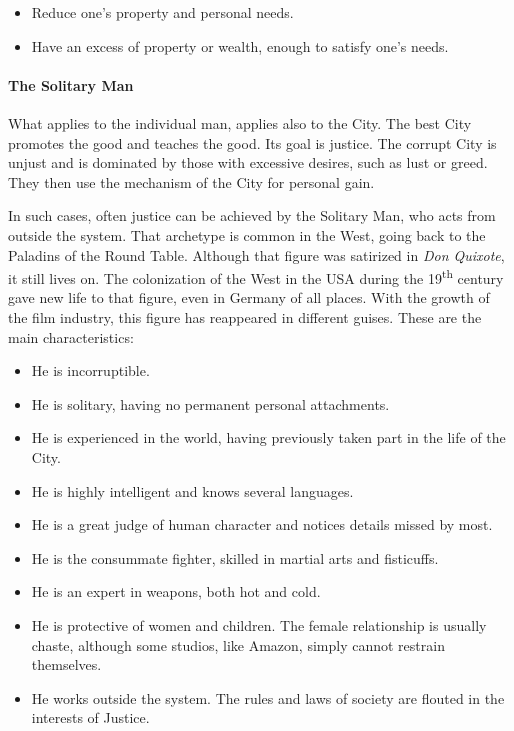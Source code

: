 \begin{itemize}


\item Reduce one's property and personal needs.

\item Have an excess of property or wealth, enough to satisfy one's needs.
\end{itemize}


\paragraph{The Solitary Man}


What applies to the individual man, applies also to the City. The best City promotes the good and teaches the good. Its goal is justice. The corrupt City is unjust and is dominated by those with excessive desires, such as lust or greed. They then use the mechanism of the City for personal gain.

In such cases, often justice can be achieved by the Solitary Man, who acts from outside the system. That archetype is common in the West, going back to the Paladins of the Round Table. Although that figure was satirized in \emph{Don Quixote}, it still lives on. The colonization of the West in the USA during the 19\textsuperscript{th} century gave new life to that figure, even in Germany of all places. With the growth of the film industry, this figure has reappeared in different guises. These are the main characteristics:

\begin{itemize}


\item He is incorruptible.

\item He is solitary, having no permanent personal attachments.

\item He is experienced in the world, having previously taken part in the life of the City.

\item He is highly intelligent and knows several languages.

\item He is a great judge of human character and notices details missed by most.

\item He is the consummate fighter, skilled in martial arts and fisticuffs.

\item He is an expert in weapons, both hot and cold.

\item He is protective of women and children. The female relationship is usually chaste, although some studios, like Amazon, simply cannot restrain themselves.

\item He works outside the system. The rules and laws of society are flouted in the interests of Justice.
\end{itemize}


